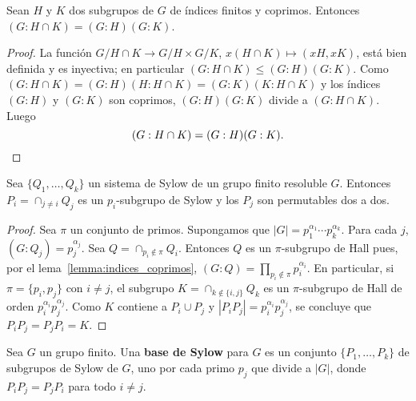 
\begin{lemma}
	\label{lemma:indices_coprimos}
	Sean $H$ y $K$ dos subgrupos de $G$ de índices finitos y coprimos. Entonces
	$(G:H\cap K)=(G:H)(G:K)$.
\end{lemma}

\begin{proof}
	La función $G/H\cap K\to G/H\times G/K$, $x(H\cap K)\mapsto(xH,xK)$, está
	bien definida y es inyectiva; en particular $(G:H\cap K)\leq (G:H)(G:K)$.
	Como $(G:H\cap K)=(G:H)(H:H\cap K)=(G:K)(K:H\cap K)$ y los índices $(G:H)$
	y $(G:K)$ son coprimos, $(G:H)(G:K)$ divide a $(G:H\cap K)$. Luego 
	\[
	(G:H\cap K)=(G:H)(G:K).\qedhere 
	\]
\end{proof}

\begin{lemma}
	\label{lemma:system=>basis}
	Sea $\{Q_1,\dots,Q_k\}$ un sistema de
	Sylow de un grupo finito resoluble $G$.	Entonces
	$P_i=\cap_{j\ne i}Q_j$ es un $p_i$-subgrupo de Sylow y los $P_j$ son
	permutables dos a dos.
\end{lemma}

\begin{proof}
	Sea $\pi$ un conjunto de primos.  Supongamos que $|G|=p_1^{\alpha_1}\cdots
	p_k^{\alpha_k}$. Para cada $j$, $(G:Q_j)=p_j^{\alpha_j}$.  Sea
	$Q=\cap_{p_i\not\in\pi}Q_i$. Entonces $Q$ es un $\pi$-subgrupo de Hall
	pues, por el lema~\ref{lemma:indices_coprimos},
	$(G:Q)=\prod_{p_i\not\in\pi}p_i^{\alpha_i}$. En particular, si
	$\pi=\{p_i,p_j\}$ con $i\ne j$, el subgrupo $K=\cap_{k\not\in\{i,j\}}Q_k$
	es un $\pi$-subgrupo de Hall de orden $p_i^{\alpha_i}p_j^{\alpha_j}$.  Como
	$K$ contiene a $P_i\cup P_j$ y $|P_iP_j|=p_i^{\alpha_i}p_j^{\alpha_j}$, se
	concluye que $P_iP_j=P_jP_i=K$.
\end{proof}

\begin{definition}
	Sea $G$ un grupo finito. Una \textbf{base de Sylow} para $G$ es 
	un conjunto $\{P_1,\dots,P_k\}$ de subgrupos de Sylow de $G$, uno por cada
	primo $p_j$ que divide a $|G|$, donde $P_iP_j=P_jP_i$ para todo $i\ne j$. 
\end{definition}

